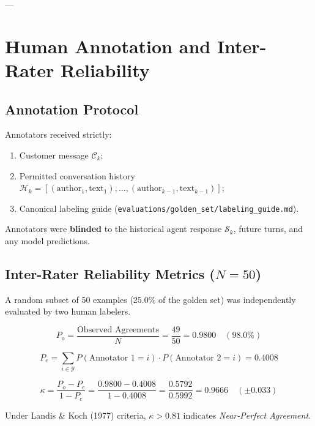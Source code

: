 \documentclass[11pt,a4paper]{article}
\begin{document}
---

\section{Human Annotation and Inter-Rater Reliability}

\subsection{Annotation Protocol}
Annotators received strictly:
\begin{enumerate}
    \item Customer message $\mathcal{C}_k$;
    \item Permitted conversation history $\mathcal{H}_k = [(\text{author}_1, \text{text}_1), \dots, (\text{author}_{k-1}, \text{text}_{k-1})]$;
    \item Canonical labeling guide (\texttt{evaluations/golden\_set/labeling\_guide.md}).
\end{enumerate}
Annotators were \textbf{blinded} to the historical agent response $\mathcal{S}_k$, future turns, and any model predictions.

\subsection{Inter-Rater Reliability Metrics ($N = 50$)}
A random subset of 50 examples ($25.0\%$ of the golden set) was independently evaluated by two human labelers.

\begin{equation}
P_o = \frac{\text{Observed Agreements}}{N} = \frac{49}{50} = 0.9800 \quad (98.0\%)
\end{equation}

\begin{equation}
P_e = \sum_{i \in \mathcal{Y}} P(\text{Annotator 1} = i) \cdot P(\text{Annotator 2} = i) = 0.4008
\end{equation}

\begin{equation}
\kappa = \frac{P_o - P_e}{1 - P_e} = \frac{0.9800 - 0.4008}{1 - 0.4008} = \frac{0.5792}{0.5992} = \mathbf{0.9666} \quad (\pm 0.033)
\end{equation}

Under Landis \& Koch (1977) criteria, $\kappa > 0.81$ indicates \textit{Near-Perfect Agreement}.
\end{document}
